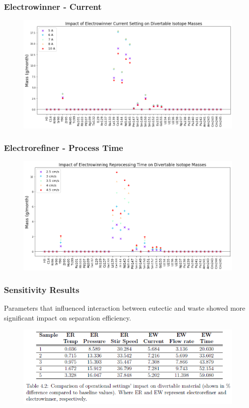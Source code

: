 \begin{frame}
	\frametitle{Electrowinner - Current}
	\begin{figure}
		\includegraphics[width=\linewidth]{./images/current-sa-diff}
	\end{figure}
\end{frame}

\begin{frame}
	\frametitle{Electrorefiner - Process Time}
	\begin{figure}
		\includegraphics[width=\linewidth]{./images/time-sa-diff}
	\end{figure}
\end{frame}

\begin{frame}
\frametitle{Sensitivity Results}
	Parameters that influenced interaction between eutectic and waste showed more significant impact on separation efficiency.
	\begin{figure}
		\includegraphics[width=\linewidth]{sens-results}
	\end{figure}
\end{frame}